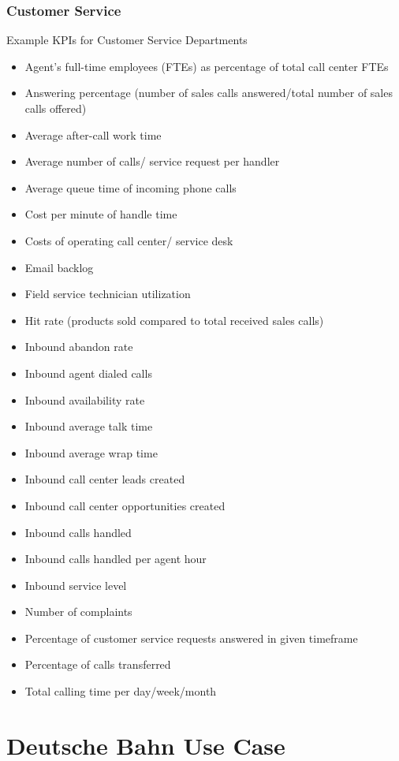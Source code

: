 \documentclass[]{book}
\providecommand{\tightlist}{%
  \setlength{\itemsep}{0pt}\setlength{\parskip}{0pt}}
\begin{document}
\subsection{Customer Service}\label{customer-service}

Example KPIs for Customer Service Departments

\begin{itemize}
\tightlist
\item
  Agent's full-time employees (FTEs) as percentage of total call center
  FTEs
\item
  Answering percentage (number of sales calls answered/total number of
  sales calls offered)
\item
  Average after-call work time
\item
  Average number of calls/ service request per handler
\item
  Average queue time of incoming phone calls
\item
  Cost per minute of handle time
\item
  Costs of operating call center/ service desk
\item
  Email backlog
\item
  Field service technician utilization
\item
  Hit rate (products sold compared to total received sales calls)
\item
  Inbound abandon rate
\item
  Inbound agent dialed calls
\item
  Inbound availability rate
\item
  Inbound average talk time
\item
  Inbound average wrap time
\item
  Inbound call center leads created
\item
  Inbound call center opportunities created
\item
  Inbound calls handled
\item
  Inbound calls handled per agent hour
\item
  Inbound service level
\item
  Number of complaints
\item
  Percentage of customer service requests answered in given timeframe
\item
  Percentage of calls transferred
\item
  Total calling time per day/week/month
\end{itemize}

\chapter{Deutsche Bahn Use Case}\label{deutsche-bahn-use-case}
\end{document}
